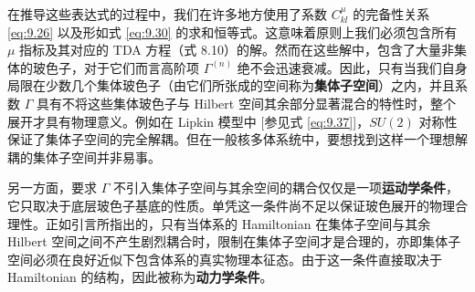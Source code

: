 在推导这些表达式的过程中，我们在许多地方使用了系数 $C^{\mu}_{kl}$ 的完备性关系 \ref{eq:9.26} 以及形如式
\ref{eq:9.30} 的求和恒等式。这意味着原则上我们必须包含所有 $\mu$ 指标及其对应的 TDA 方程（式 8.10）的解。然而在这些解中，包含了大量非集体的玻色子，对于它们而言高阶项
$\Gamma^{(n)}$ 绝不会迅速衰减。因此，只有当我们自身局限在少数几个集体玻色子（由它们所张成的空间称为\textbf{集体子空间}）之内，并且系数
$\Gamma$ 具有不将这些集体玻色子与 Hilbert 空间其余部分显著混合的特性时，整个展开才具有物理意义。例如在 Lipkin
模型中 {[}参见式 \ref{eq:9.37}{]}，$SU(2)$ 对称性保证了集体子空间的完全解耦。但在一般核多体系统中，要想找到这样一个理想解耦的集体子空间并非易事。

另一方面，要求 $\Gamma$ 不引入集体子空间与其余空间的耦合仅仅是一项\textbf{运动学条件}，它只取决于底层玻色子基底的性质。单凭这一条件尚不足以保证玻色展开的物理合理性。正如引言所指出的，只有当体系的
Hamiltonian 在集体子空间与其余 Hilbert 空间之间不产生剧烈耦合时，限制在集体子空间才是合理的，亦即集体子空间必须在良好近似下包含体系的真实物理本征态。由于这一条件直接取决于
Hamiltonian 的结构，因此被称为\textbf{动力学条件}。

